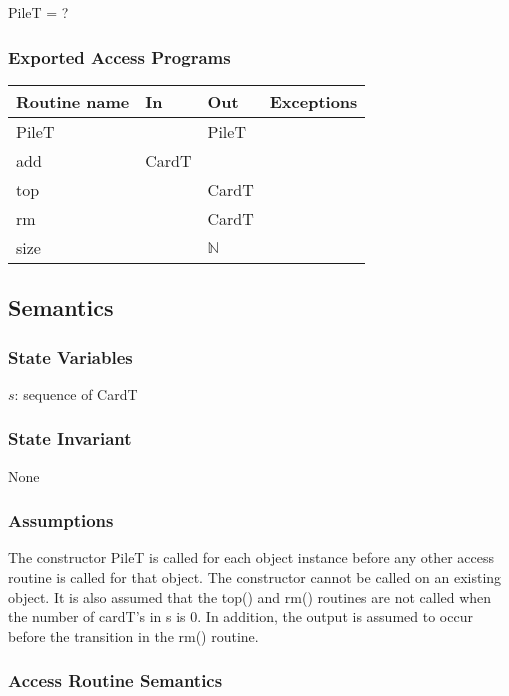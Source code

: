 \documentclass[12pt]{article}
\begin{document}
PileT = ?

\subsubsection* {Exported Access Programs}

\begin{tabular}{| l | l | l | l |}
\hline
\textbf{Routine name} & \textbf{In} & \textbf{Out} & \textbf{Exceptions}\\
\hline
PileT & ~ & PileT & \\
\hline
add & CardT & ~ & ~\\
\hline
top & ~ & CardT & ~\\
\hline
rm & ~ & CardT & ~\\
\hline
size & ~ & $\mathbb{N}$ & ~\\
\hline
\end{tabular}

\subsection* {Semantics}

\subsubsection* {State Variables}

$s$: sequence of CardT

\subsubsection* {State Invariant}

None

\subsubsection* {Assumptions}

The constructor PileT is called for each object instance before any other
access routine is called for that object.  The constructor cannot be called on
an existing object. It is also assumed that the top() and rm() routines are not called when the number of cardT's in s is 0. In addition, the output is assumed to occur before the transition in the rm() routine.

\subsubsection* {Access Routine Semantics}
\end{document}
